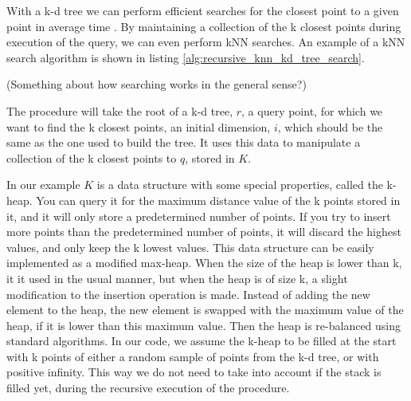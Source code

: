 With a k-d tree we can perform efficient searches for the closest point to a given point in  average time \cite{Friedman:1977}. By maintaining a collection of the k closest points during execution of the query, we can even perform kNN searches. An example of a kNN search algorithm is shown in listing \ref{alg:recursive_knn_kd_tree_search}.

(Something about how searching works in the general sense?)

The procedure will take the root of a k-d tree, $r$, a query point, for which we want to find the k closest points, an initial dimension, $i$, which should be the same as the one used to build the tree. It uses this data to manipulate a collection of the k closest points to $q$, stored in $K$.

In our example $K$ is a data structure with some special properties, called the k-heap. You can query it for the maximum distance value of the k points stored in it, and it will only store a predetermined number of points. If you try to insert more points than the predetermined number of points, it will discard the highest values, and only keep the k lowest values. This data structure can be easily implemented as a modified max-heap. When the size of the heap is lower than k, it it used in the usual manner, but when the heap is of size k, a slight modification to the insertion operation is made. Instead of adding the new element to the heap, the new element is swapped with the maximum value of the heap, if it is lower than this maximum value. Then the heap is re-balanced using standard algorithms. In our code, we assume the k-heap to be filled at the start with k points of either a random sample of points from the k-d tree, or with positive infinity. This way we do not need to take into account if the stack is filled yet, during the recursive execution of the procedure.

